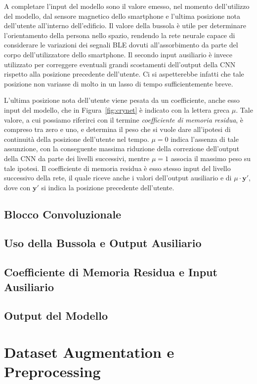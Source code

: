 A completare l'input del modello sono il valore emesso, nel momento
dell'utilizzo del modello, dal sensore magnetico dello smartphone e
l'ultima posizione nota dell'utente all'interno dell'edificio. Il valore della
bussola è utile per determinare l'orientamento della persona nello spazio,
rendendo la rete neurale capace di considerare le variazioni dei segnali BLE
dovuti all'assorbimento da parte del corpo dell'utilizzatore dello smartphone.
Il secondo input ausiliario è invece utilizzato per correggere eventuali grandi
scostamenti dell'output della CNN rispetto alla posizione precedente
dell'utente. Ci si aspetterebbe infatti che tale posizione non variasse di
molto in un lasso di tempo sufficientemente breve.

L'ultima posizione nota dell'utente viene pesata da un coefficiente, anche esso
input del modello, che in Figura~\ref{fig:crynet} è indicato con la lettera
greca \(\mu\). Tale valore, a cui possiamo riferirci con il termine
\emph{coefficiente di memoria residua}, è compreso tra zero e uno, e determina
il peso che si vuole dare all'ipotesi di continuità della posizione dell'utente
nel tempo.  \(\mu = 0\) indica l'assenza di tale assunzione, con la conseguente
massima riduzione della correzione dell'output della CNN da parte dei livelli
successivi, mentre \(\mu = 1 \) associa il massimo peso su tale ipotesi. Il
coefficiente di memoria residua è esso stesso input del livello successivo
della rete, il quale riceve anche i valori dell'output ausiliario e di \( \mu
  \cdot \bm y'\), dove con \(\bm y'\) si indica la posizione precedente dell'utente.
\subsection{Blocco Convoluzionale}
\subsection{Uso della Bussola e Output Ausiliario}
\subsection{Coefficiente di Memoria Residua e Input Ausiliario}
\subsection{Output del Modello}
\section{Dataset Augmentation e Preprocessing}
